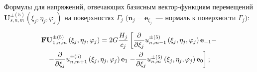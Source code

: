 \begin{russian}
%
%
%

Формулы для напряжений, отвечающих базисным вектор-функциям перемещений $\mathbf{U}_{s,n,m}^{\pm(5)}(\xi_j,\eta_j,\varphi_j)$ на поверхностях $\Gamma_j$ ($\mathbf{n}_j=\mathbf{e}_{\xi_j}$~--- нормаль к поверхности  $\Gamma_j$):

\begin{multline}
{\bf{FU}}_{1,n,m}^{ \pm (5)}\left( {{\xi _j},{\eta _j},{\varphi _j}} \right) = 2G\frac{{{H_j}}}{{{c_j}}}\left[ {\frac{\partial }{{\partial {\xi _j}}}u_{n,m - 1}^{ \pm (5)}\left( {{\xi _j},{\eta _j},{\varphi _j}} \right){{\bf{e}}_{ - 1}} - } \right.\\
- \frac{\partial }{{\partial {\xi _j}}}u_{n,m + 1}^{ \pm (5)}\left( {{\xi _j},{\eta _j},{\varphi _j}} \right){{\bf{e}}_1}\left. { - \frac{\partial }{{\partial {\xi _j}}}u_{n,m}^{ \pm (5)}\left( {{\xi _j},{\eta _j},{\varphi _j}} \right){{\bf{e}}_0}} \right];
\label{eq:9:f1}
\end{multline}


\end{russian}
